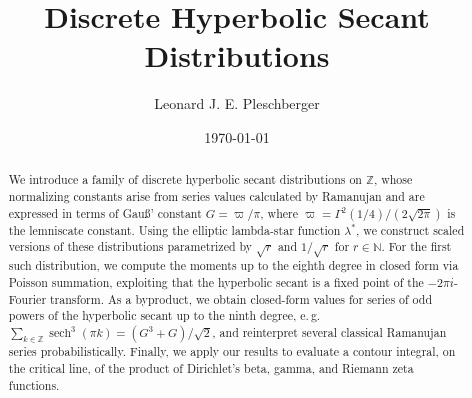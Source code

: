 \documentclass[12pt]{amsart}
\theoremstyle{definition}
\theoremstyle{remark}
\numberwithin{equation}{section}
\newcommand{\1}{\mathbbm{1}}
\begin{document}
\title[Discrete Hyperbolic Secant Distributions]{Discrete Hyperbolic Secant Distributions}



\author{Leonard J. E. Pleschberger}
\address{Leonard Jobst Eberhard Pleschberger, Neptunstra\ss e 18, D\"usseldorf D-40223 \& Sechshauser Stra\ss e 24/1/15, A-1150 Vienna.}


\date{\today}

\maketitle


\begin{abstract}
We introduce a family of discrete hyperbolic secant distributions on $\mathbb{Z}$, whose normalizing constants arise from series values calculated by Ramanujan and are expressed in terms of Gau\ss' constant $G=\varpi/\pi$, where $\varpi=\Gamma^2(1/4)/(2\sqrt{2\pi})$ is the lemniscate constant. Using the elliptic lambda-star function $\lambda^*$, we construct scaled versions of these distributions parametrized by $\sqrt{r}$ and $1/\sqrt{r}$ for $r \in \mathbb{N}$. For the first such distribution, we compute the moments up to the eighth degree in closed form via Poisson summation, exploiting that the hyperbolic secant is a fixed point of the $-2\pi i$-Fourier transform. As a byproduct, we obtain closed-form values for series of odd powers of the hyperbolic secant up to the ninth degree, e.\,g.\ $\sum_{k \in \mathbb{Z}} \operatorname{sech}^3(\pi k) = (G^3+G)/\sqrt{2}$, and reinterpret several classical Ramanujan series probabilistically. Finally, we apply our results to evaluate a contour integral, on the critical line, of the product of Dirichlet's beta, gamma, and Riemann zeta functions.
\end{abstract}
\end{document}
